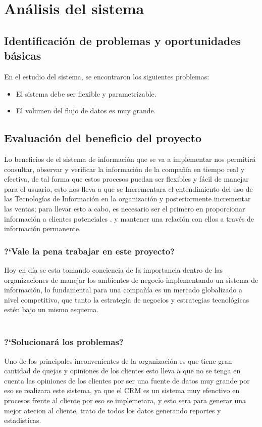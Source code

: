 \chapter{An\'alisis del sistema}
\section{Identificaci\'on de problemas y oportunidades b\'asicas}
En el estudio del sistema, se encontraron los siguientes problemas:%
\\%
\begin{itemize}
	\item El sistema debe ser flexible y parametrizable.%
	\item El volumen del flujo de datos es muy grande.%
\end{itemize}%
%
\section{Evaluaci\'on del beneficio del proyecto}
Lo beneficios de el sistema de informaci\'on que se va a implementar nos permitir\'a consultar, observar y verificar la informaci\'on de la compa\~n\'ia en tiempo real y efectiva, de tal forma que estos procesos puedan ser flexibles y f\'acil de manejar para el usuario, esto nos lleva a que se Incrementara  el entendimiento del uso de las Tecnolog\'ias de Informaci\'on en la organizaci\'on y posteriormente  incrementar las ventas; para llevar esto a cabo, es necesario ser el primero en proporcionar informaci\'on a clientes potenciales . y mantener una relaci\'on con ellos a trav\'es de informaci\'on permanente.%
%
\subsection{?`Vale la pena trabajar en este proyecto?}
Hoy en d\'ia se esta tomando conciencia de la importancia dentro de las organizaciones de manejar los ambientes de negocio implementando un sistema de informaci\'on, lo fundamental para una compa\~n\'ia es un mercado globalizado a nivel competitivo, que tanto la estrategia de negocios y estrategias tecnol\'ogicas est\'en bajo un mismo esquema.%
\\%
\\%
\subsection{?`Solucionar\'a los problemas?}
Uno de los principales inconvenientes de la organizaci\'on es que tiene gran cantidad de quejas y opiniones de los clientes esto lleva a que no se tenga en cuenta las opiniones de los clientes por ser una fuente de datos muy grande por eso se realizara este sistema, ya que el CRM es un sistema muy efenctivo en procesos frente al cliente por eso se implemetara, y esto sera para generar una mejor atecion al cliente, trato de todos los datos generando reportes y estadisticas.%
%
